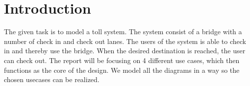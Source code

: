 \clearpage
{}
\section*{Introduction}
The given task is to model a toll system. The system consist of a bridge with a number of check in and check out lanes. The users of the system is able to check in and thereby use the bridge. When the desired destination is reached, the user can check out. 
The report will be focusing on 4 different use cases, which then functions as the core of the design. We model all the diagrams in a way so the chosen usecases can be realized.